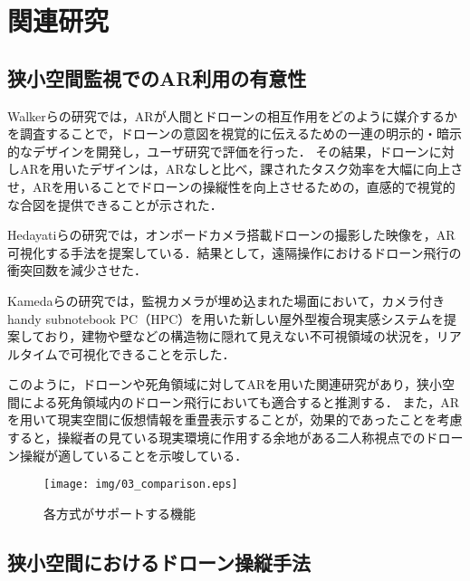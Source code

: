 \documentclass[submit, sigrecommended]{ipsj}
\begin{document}
\section{関連研究}
\subsection{狭小空間監視でのAR利用の有意性}
Walkerらの研究\cite{book-ar01}では，ARが人間とドローンの相互作用をどのように媒介するかを調査することで，ドローンの意図を視覚的に伝えるための一連の明示的・暗示的なデザインを開発し，ユーザ研究で評価を行った．
その結果，ドローンに対しARを用いたデザインは，ARなしと比べ，課されたタスク効率を大幅に向上させ，ARを用いることでドローンの操縦性を向上させるための，直感的で視覚的な合図を提供できることが示された．

Hedayatiらの研究\cite{book-ar02}では，オンボードカメラ搭載ドローンの撮影した映像を，AR可視化する手法を提案している．結果として，遠隔操作におけるドローン飛行の衝突回数を減少させた．

Kamedaらの研究\cite{book-ar03}では，監視カメラが埋め込まれた場面において，カメラ付きhandy subnotebook PC（HPC）を用いた新しい屋外型複合現実感システムを提案しており，建物や壁などの構造物に隠れて見えない不可視領域の状況を，リアルタイムで可視化できることを示した．

このように，ドローンや死角領域に対してARを用いた関連研究があり，狭小空間による死角領域内のドローン飛行においても適合すると推測する．
また，ARを用いて現実空間に仮想情報を重畳表示することが，効果的であったことを考慮すると，操縦者の見ている現実環境に作用する余地がある二人称視点でのドローン操縦が適していることを示唆している．

  
\begin{figure*}[!tb]
  \centering
  \texttt{[image: img/03\_comparison.eps]}
  \caption{各方式がサポートする機能}
  \label{fig:03_comparison}
\end{figure*}



\subsection{狭小空間におけるドローン操縦手法}
\end{document}
